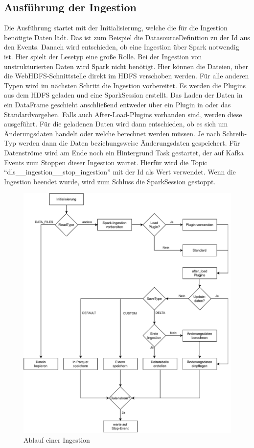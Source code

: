 \subsection{Ausführung der Ingestion}
\label{sec:ingestion-run}
Die Ausführung startet mit der Initialisierung, welche die für die Ingestion benötigte Daten lädt.
Das ist zum Beispiel die DatasourceDefinition zu der Id aus den Events.
Danach wird entschieden, ob eine Ingestion über Spark notwendig ist.
Hier spielt der Lesetyp eine große Rolle.
Bei der Ingestion von unstrukturierten Daten wird Spark nicht benötigt.
Hier können die Dateien, über die WebHDFS-Schnittstelle direkt im HDFS verschoben werden.
Für alle anderen Typen wird im nächsten Schritt die Ingestion vorbereitet.
Es werden die Plugins aus dem HDFS geladen und eine SparkSession erstellt.
Das Laden der Daten in ein DataFrame geschieht anschließend entweder über ein Plugin in oder das Standardvorgehen.
Falls auch After-Load-Plugins vorhanden sind, werden diese ausgeführt.
Für die geladenen Daten wird dann entschieden, ob es sich um Änderungsdaten handelt oder welche berechnet werden müssen.
Je nach Schreib-Typ werden dann die Daten beziehungsweise Änderungsdaten gespeichert.
Für Datenströme wird am Ende noch ein Hintergrund Task gestartet, der auf Kafka Events zum Stoppen dieser Ingestion wartet.
Hierfür wird die Topic "`dls\_\_ingestion\_\_stop\_ingestion"' mit der Id als Wert verwendet.
Wenn die Ingestion beendet wurde, wird zum Schluss die SparkSession gestoppt.

\begin{figure}
    \centering
    \includegraphics[width=\textwidth]{Grafiken/Umsetzung-Ingestion-Ablauf.pdf}
    \caption{Ablauf einer Ingestion}
    \label{fig:umsetz-ingestion-ablauf}
\end{figure}